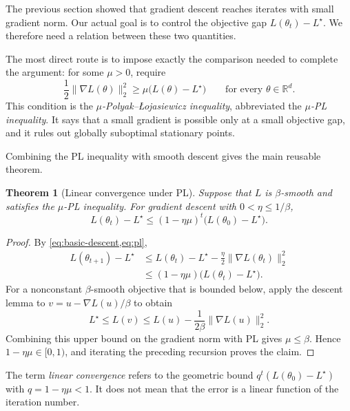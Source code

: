 \documentclass[11pt,twoside]{article}
\newcommand{\R}{\mathbb R}
\newtheorem{theorem}{Theorem}[section]
\theoremstyle{definition}
\theoremstyle{remark}
\begin{document}
The previous section showed that gradient descent reaches iterates with small
gradient norm. Our actual goal is to control the objective gap
$L(\theta_t)-L^\star$. We therefore need a relation between these two
quantities.

The most direct route is to impose exactly the comparison needed to complete
the argument: for some $\mu>0$, require
\begin{equation}
 \frac12\|\nabla L(\theta)\|_2^2
 \ge \mu\bigl(L(\theta)-L^\star\bigr)
 \qquad\text{for every }\theta\in\R^d.
 \label{eq:pl}
\end{equation}
This condition is the \emph{$\mu$-Polyak--\L{}ojasiewicz inequality},
abbreviated the \emph{$\mu$-PL inequality}. It says that a small gradient is
possible only at a small objective gap, and it rules out globally suboptimal
stationary points.

Combining the PL inequality with smooth descent gives the main reusable
theorem.

\begin{theorem}[Linear convergence under PL]
\label{thm:pl-linear}
Suppose that $L$ is $\beta$-smooth and satisfies the $\mu$-PL inequality.
For gradient descent with $0<\eta\le1/\beta$,
\begin{equation}
 L(\theta_t)-L^\star
 \le(1-\eta\mu)^t
       \bigl(L(\theta_0)-L^\star\bigr).
 \label{eq:pl-linear-rate}
\end{equation}
\end{theorem}

\begin{proof}
By \cref{eq:basic-descent,eq:pl},
\begin{align*}
 L(\theta_{t+1})-L^\star
 &\le L(\theta_t)-L^\star
 -\frac\eta2\|\nabla L(\theta_t)\|_2^2\\
 &\le(1-\eta\mu)\bigl(L(\theta_t)-L^\star\bigr).
\end{align*}
For a nonconstant $\beta$-smooth objective that is bounded below, apply the
descent lemma to $v=u-\nabla L(u)/\beta$ to obtain
\[
 L^\star\le L(v)
 \le L(u)-\frac1{2\beta}\|\nabla L(u)\|_2^2.
\]
Combining this upper bound on the gradient norm with PL gives
$\mu\le\beta$. Hence $1-\eta\mu\in[0,1)$, and iterating the preceding
recursion proves the claim.
\end{proof}

The term \emph{linear convergence} refers to the geometric bound
$q^t(L(\theta_0)-L^\star)$ with $q=1-\eta\mu<1$. It does not mean that the
error is a linear function of the iteration number.
\end{document}
